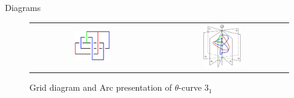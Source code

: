 \documentclass[final]{beamer}
\begin{document}
\begin{frame}[t]
\begin{columns}[t]
\begin{block}{Diagrams}
\begin{Diagrams}
      \begin{figure}[h]
        \centering
        \begin{tabular}{cc}
          \includegraphics[width=0.3\textwidth]{figure/grid.png} &
          \includegraphics[width=0.3\textwidth]{figure/openbook.png} \\
        \end{tabular}
        \caption{Grid diagram and Arc presentation of $\theta$-curve $3_1$}
      \end{figure}
    \end{Diagrams}

  \end{block}
\end{columns}


\end{frame}
\end{document}
